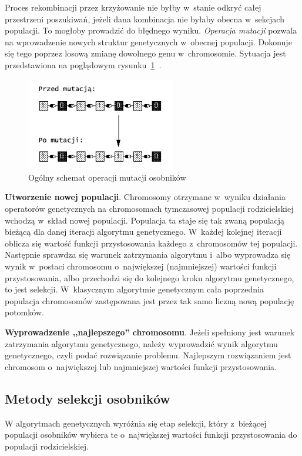 \documentclass[twoside,12pt]{report}
\begin{document}
Proces rekombinacji przez krzyżowanie nie byłby w~stanie odkryć całej przestrzeni poszukiwań, jeżeli dana kombinacja nie byłaby obecna w~sekcjach populacji. To mogłoby prowadzić do błędnego wyniku. \textit{Operacja mutacji} pozwala na wprowadzenie nowych struktur genetycznych w~obecnej populacji. Dokonuje się tego poprzez losową zmianę dowolnego genu w~chromosomie. Sytuacja jest przedstawiona na poglądowym rysunku~\ref{fig:mutacja_schemat}~\cite{genetyczne-dane=ewo}.

\begin{figure}[htbp]
	\centering
	\includegraphics[width=0.580\textwidth]{img/mutation}
	\caption{Ogólny schemat operacji mutacji osobników}
	\label{fig:mutacja_schemat}
\end{figure}

\textbf{Utworzenie nowej populacji}. Chromosomy otrzymane w~wyniku działania operatorów genetycznych na chromosomach tymczasowej populacji rodzicielskiej wchodzą w~skład nowej populacji. Populacja ta staje się tak zwaną populacją bieżącą dla danej iteracji algorytmu genetycznego. W~każdej kolejnej iteracji oblicza się wartość funkcji przystosowania każdego z~chromosomów tej populacji. Następnie sprawdza się warunek zatrzymania algorytmu i~albo wyprowadza się wynik w~postaci chromosomu o~największej (najmniejszej) wartości funkcji przystosowania, albo przechodzi się do kolejnego kroku algorytmu genetycznego, to jest selekcji. W~klasycznym algorytmie genetycznym cała poprzednia populacja chromosomów zastępowana jest przez tak samo liczną nową populację potomków.

\textbf{Wyprowadzenie ,,najlepszego'' chromosomu}. Jeżeli spełniony jest warunek zatrzymania algorytmu genetycznego, należy wyprowadzić wynik algorytmu genetycznego, czyli podać rozwiązanie problemu. Najlepszym rozwiązaniem jest chromosom o~największej lub najmniejszej wartości funkcji przystosowania.

\subsection{Metody selekcji osobników}\label{sec:selekcja}
W algorytmach genetycznych wyróżnia się etap selekcji, który z~bieżącej populacji osobników wybiera te o~największej wartości funkcji przystosowania do populacji rodzicielskiej.
\end{document}
